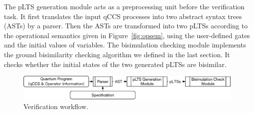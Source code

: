 \documentclass[a4paper,UKenglish,cleveref, autoref]{lipics-v2019}
\begin{document}
The pLTS generation module acts as a preprocessing unit before the verification task. It first translates the input qCCS processes  into two abstract syntax trees (ASTs) by a parser. Then the ASTs are transformed into two pLTSs according to the operational semantics given in Figure~\ref{fig:opsem}, using the user-defined gates and the initial values of variables.
%
The  bisimulation checking module  implements the ground bisimilarity checking algorithm we defined in the last section. It checks whether the initial states of the two generated pLTSs are bisimilar. 
\begin{figure}[htbp]
\centering
\includegraphics[width=\textwidth]{images/architecture.eps}
\caption{Verification workflow.}
\label{fig:arch}
\end{figure}
\end{document}
